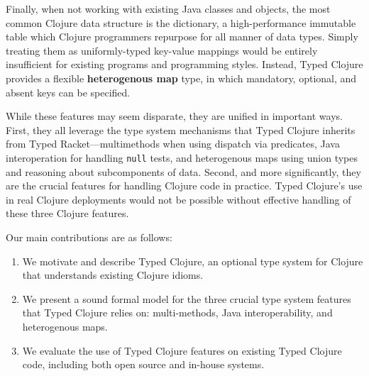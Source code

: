 Finally, when not working with existing Java classes and objects, the
most common Clojure data structure is the dictionary, a
high-performance immutable table which Clojure programmers repurpose
for all manner of data types. Simply treating them as uniformly-typed
key-value mappings would be entirely insufficient for existing
programs and programming styles. Instead, Typed Clojure provides a
flexible \textbf{heterogenous map} type, in which mandatory, optional, and
absent keys can be specified. 


While these features may seem disparate, they are unified in important
ways. First, they all leverage the type system mechanisms that Typed
Clojure inherits from Typed Racket---multimethods when using 
dispatch via predicates, Java interoperation for handling
\texttt{null} tests, and heterogenous maps using union types and
reasoning about subcomponents of data. Second, and more significantly,
they are the crucial features for handling Clojure code in
practice. Typed Clojure's use in real Clojure deployments would not be
possible without effective handling of these three Clojure features. 


Our main contributions are as follows:

\begin{enumerate}
  \item We motivate and describe  Typed Clojure, an optional
    type system for Clojure that understands existing Clojure idioms.
  \item We present a sound formal model for the three crucial type
    system features that Typed Clojure relies on: multi-methods, Java
    interoperability, and heterogenous maps.
  \item We evaluate the use of Typed Clojure features on existing
    Typed Clojure code, including both open source and in-house systems.
\end{enumerate}





